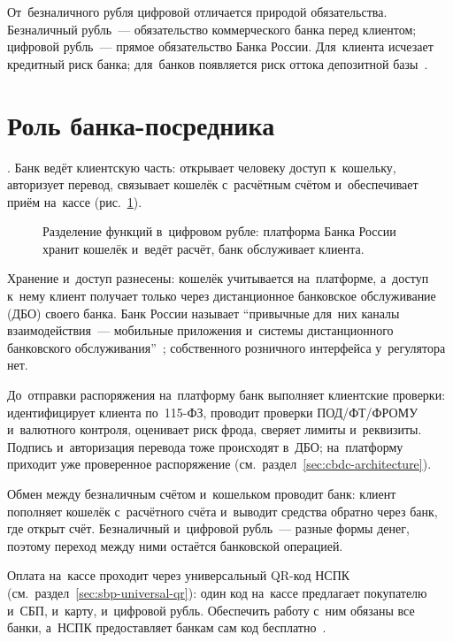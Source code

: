От~безналичного рубля цифровой отличается природой обязательства. Безналичный
рубль~--- обязательство коммерческого банка перед клиентом; цифровой рубль~---
прямое обязательство Банка России. Для~клиента исчезает кредитный риск банка;
для~банков появляется риск оттока депозитной базы~\cite{cbr-digital-ruble}.

\section{Роль банка-посредника}\label{sec:cbdc-client-layer}

. Банк ведёт клиентскую часть: открывает
человеку доступ к~кошельку, авторизует перевод, связывает кошелёк с~расчётным
счётом и~обеспечивает приём на~кассе (рис.~\ref{fig:cbdc-client-layer}).

\begin{figure}[!ht]
  \centering
  \caption{Разделение функций в~цифровом рубле: платформа Банка России хранит
  кошелёк и~ведёт расчёт, банк обслуживает клиента.}\label{fig:cbdc-client-layer}
\end{figure}

Хранение и~доступ разнесены: кошелёк учитывается на~платформе, а~доступ к~нему
клиент получает только через дистанционное банковское обслуживание (ДБО) своего
банка. Банк России называет \enquote{привычные для~них каналы
  взаимодействия~--- мобильные приложения и~системы дистанционного банковского
обслуживания}~\cite{cbr-dr-status-2025}; собственного
розничного интерфейса у~регулятора нет.

До~отправки распоряжения на~платформу банк выполняет клиентские проверки:
идентифицирует клиента по~115-ФЗ, проводит проверки ПОД/ФТ/ФРОМУ и~валютного
контроля, оценивает риск фрода, сверяет лимиты и~реквизиты. Подпись
и~авторизация перевода тоже происходят в~ДБО; на~платформу приходит уже
проверенное распоряжение (см.~раздел~\ref{sec:cbdc-architecture}).

Обмен между безналичным счётом и~кошельком проводит банк: клиент пополняет
кошелёк с~расчётного счёта и~выводит средства обратно через банк, где открыт
счёт. Безналичный и~цифровой рубль~--- разные формы денег, поэтому переход между
ними остаётся банковской операцией.

Оплата на~кассе проходит через универсальный QR-код НСПК
(см.~раздел~\ref{sec:sbp-universal-qr}): один код на~кассе предлагает покупателю
и~СБП, и~карту, и~цифровой рубль. Обеспечить работу с~ним обязаны все банки,
а~НСПК предоставляет банкам сам код бесплатно~\cite{cbr-mass-rollout-2025}.

